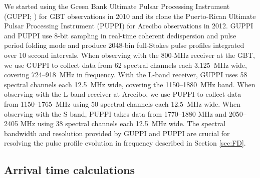 We started using 
the Green Bank Ultimate Pulsar Processing Instrument (GUPPI; \citealt{GUPPI}) for GBT 
observations in 2010 and its clone the Puerto-Rican Ultimate Pulsar Processing Instrument
(PUPPI) for Arecibo observations in 2012. 
GUPPI and PUPPI use 8-bit sampling in real-time coherent dedispersion and
pulse period folding mode and produce 2048-bin full-Stokes
pulse profiles integrated over 10 second intervals.
When observing with the 800-MHz receiver at the GBT, we use GUPPI to collect data from 62 spectral 
channels each 3.125~MHz wide, covering 724--918~MHz in frequency. With the L-band receiver, GUPPI
uses 58 spectral channels each 12.5~MHz wide, covering the 1150--1880~MHz band. 
When observing with the L-band receiver at Arecibo, we use PUPPI to collect data
from 1150--1765~MHz using 50 spectral channels each 12.5~MHz wide. When observing with the S band,
PUPPI takes data from 1770--1880 MHz and 2050--2405 MHz using 38 spectral
channels each 12.5~MHz wide.
The spectral bandwidth and resolution provided by GUPPI and PUPPI are crucial for resolving the pulse profile evolution in frequency described in Section \ref{sec:FD}.

\subsection{Arrival time calculations}

